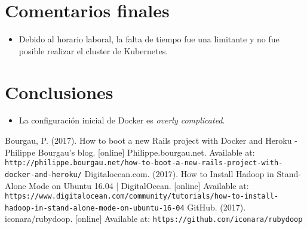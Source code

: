 \documentclass{article}
\begin{document}
\section{Comentarios finales}
\begin{itemize}
  \item Debido al horario laboral, la falta de tiempo fue una limitante y no fue posible realizar el cluster de Kubernetes. 
\end{itemize}

\section{Conclusiones}
\begin{itemize}
  \item La configuraci\'on inicial de Docker es \emph{overly complicated}.
\end{itemize}

\begin{thebibliography}{99}
  Bourgau, P. (2017). How to boot a new Rails project with Docker and Heroku - Philippe Bourgau's blog. [online] Philippe.bourgau.net. Available at: \texttt{http://philippe.bourgau.net/how-to-boot-a-new-rails-project-with-docker-and-heroku/}
  Digitalocean.com. (2017). How to Install Hadoop in Stand-Alone Mode on Ubuntu 16.04 | DigitalOcean. [online] Available at: \texttt{https://www.digitalocean.com/community/tutorials/how-to-install-hadoop-in-stand-alone-mode-on-ubuntu-16-04}
  GitHub. (2017). iconara/rubydoop. [online] Available at: \texttt{https://github.com/iconara/rubydoop}
\end{thebibliography}
\end{document}
